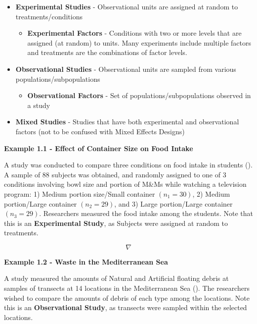\documentclass[
]{book}
\providecommand{\tightlist}{%
  \setlength{\itemsep}{0pt}\setlength{\parskip}{0pt}}
\begin{document}
\begin{itemize}
\tightlist
\item
  \textbf{Experimental Studies} - Observational units are assigned at
  random to treatments/conditions

  \begin{itemize}
  \tightlist
  \item
    \textbf{Experimental Factors} - Conditions with two or more levels
    that are assigned (at random) to units. Many experiments include
    multiple factors and treatments are the combinations of factor
    levels.
  \end{itemize}
\item
  \textbf{Observational Studies} - Observational units are sampled from
  various populations/subpopulations

  \begin{itemize}
  \tightlist
  \item
    \textbf{Observational Factors} - Set of populations/subpopulations
    observed in a study
  \end{itemize}
\item
  \textbf{Mixed Studies} - Studies that have both experimental and
  observational factors (not to be confused with Mixed Effects Designs)
\end{itemize}

\textbf{Example 1.1 - Effect of Container Size on Food Intake}

A study was conducted to compare three conditions on food intake in
students (). A sample of 88 subjects was obtained, and randomly assigned to
one of 3 conditions involving bowl size and portion of M\&Ms while
watching a television program: 1) Medium portion size/Small container
\((n_1 = 30)\), 2) Medium portion/Large container \((n_2 = 29)\), and 3)
Large portion/Large container \((n_3 = 29)\). Researchers measured the
food intake among the students. Note that this is an
\textbf{Experimental Study}, as Subjects were assigned at random to
treatments.

\[\nabla\]

\textbf{Example 1.2 - Waste in the Mediterranean Sea}

A study measured the amounts of Natural and Artificial floating debris
at samples of transects at 14 locations in the Mediterranean Sea
(). The researchers
wished to compare the amounts of debris of each type among the
locations. Note this is an \textbf{Observational Study}, as transects
were sampled within the selected locations.
\end{document}
